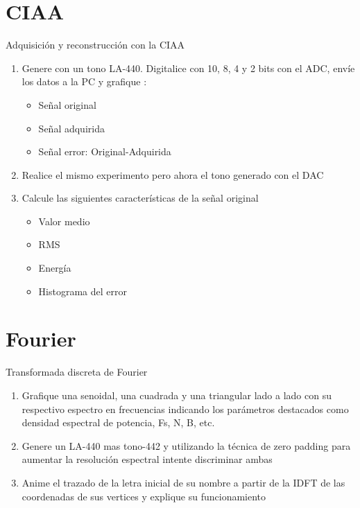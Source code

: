  \section{CIAA}
 \begin{frame}{Adquisición y reconstrucción con la CIAA}
    \begin{enumerate}
       \item{Genere con un tono LA-440. Digitalice con 10, 8, 4 y 2 bits con el ADC, envíe los datos a la PC y grafique :}
          \begin{itemize}
             \item{Señal original}
             \item{Señal adquirida}
             \item{Señal error: Original-Adquirida}
          \end{itemize}
       \item{Realice el mismo experimento pero ahora el tono generado con el DAC}
       \item{Calcule las siguientes características de la señal original}
   \begin{itemize}
      \item{Valor medio}
      \item{RMS}
      \item{Energía}
      \item{Histograma del error}
   \end{itemize}
    \end{enumerate}
 \end{frame}
 \section{Fourier}
 \begin{frame}{Transformada discreta de Fourier}
    \begin{enumerate}
       \item{Grafique una senoidal, una cuadrada y una triangular lado a lado con su respectivo espectro en frecuencias indicando los parámetros destacados como densidad espectral de potencia, Fs, N, B, etc.}
       \item{Genere un LA-440 mas tono-442 y utilizando la técnica de zero padding para aumentar la resolución espectral intente discriminar ambas}
       \item{Anime el trazado de la letra inicial de su nombre a partir de la IDFT de las coordenadas de sus vertices y explique su funcionamiento}
    \end{enumerate}
 \end{frame}
